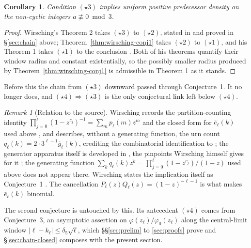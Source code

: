 \documentclass[11pt]{article}
\newtheorem{corollary}[theorem]{Corollary}
\theoremstyle{definition}
\theoremstyle{remark}
\newtheorem{remark}[theorem]{Remark}
\begin{document}
\begin{corollary}\label{cor:star3-density}
Condition $(\star3)$ implies uniform positive predecessor density on the
non-cyclic integers $a\not\equiv0\bmod3$.
\end{corollary}

\begin{proof}
Wirsching's Theorem 2 takes $(\star3)$ to $(\star2)$, stated in
\cite[\S3]{Wirsching2003} and proved in \S\ref{sec:chain} above;
Theorem~\ref{thm:wirsching-conj1} takes
$(\star2)$ to $(\star1)$, and his Theorem 1 takes $(\star1)$ to the
conclusion \cite[\S1]{Wirsching2003}. Both of his theorems quantify
their window radius and constant existentially, so the possibly smaller
radius produced by Theorem~\ref{thm:wirsching-conj1} is admissible in
Theorem 1 as it stands.
\end{proof}

Before this the chain from $(\star3)$ downward passed through
Conjecture~1. It no longer does, and $(\star4)\Rightarrow(\star3)$ is
the only conjectural link left below $(\star4)$.

\begin{remark}[Relation to the source]\label{rem:wirsching-conj1-source}
Wirsching records the partition-counting identity
$\prod_{j=0}^\ell(1-z^{c_j})^{-1}=\sum_mp_\ell(m)z^m$
\cite[\S2, eq.~(2.2)]{Wirsching2003} and the closed
form for $\bar e_\ell(k)$ used above \cite[\S1, eq.~(1.4)]{Wirsching2003},
and describes, without a generating function, the urn count
$q_\ell(k)=2\cdot3^{\ell-1}\bar g_\ell(k)$, crediting the combinatorial
identification to \cite{Wirsching1998Urns} \cite[\S2]{Wirsching2003};
the generator apparatus itself is developed in
\cite[Ch.~IV, p.~103 and Thm.~IV.1.14]{Wirsching1998Book}, the pinpoints
Wirsching himself gives for it \cite[\S2]{Wirsching2003};
the generating function
$\sum_kq_\ell(k)z^k=\prod_{j=0}^\ell(1-z^{c_j})/(1-z)$ used above does
not appear there. Wirsching states the implication itself as
Conjecture~1 \cite[\S\S1--2]{Wirsching2003}. The cancellation
$P_\ell(z)Q_\ell(z)=(1-z)^{-\ell-1}$ is what makes $\bar e_\ell(k)$
binomial.
\end{remark}

The second conjecture is untouched by this. Its antecedent
$(\star4)$ comes from Conjecture~3, an asymptotic assertion on
$\varphi(z_\ell)/\varphi_0(z_\ell)$ along the central-limit window
$|\ell-k_\ell|\le\delta_5\sqrt\ell$, which \S\S\ref{sec:prelim} to
\ref{sec:proofs} prove and \S\ref{sec:chain-closed} composes with the
present section.
\end{document}
